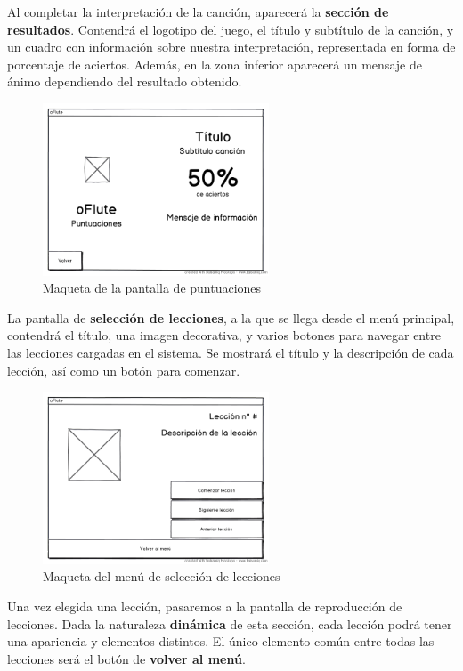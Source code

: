 \pagebreak

Al completar la interpretación de la canción, aparecerá la \textbf{sección de
  resultados}. Contendrá el logotipo del juego, el título y subtítulo de la
canción, y un cuadro con información sobre nuestra interpretación, representada
en forma de porcentaje de aciertos. Además, en la zona inferior aparecerá un
mensaje de ánimo dependiendo del resultado obtenido.

\begin{figure}[h!]
  \centering
  \includegraphics[width=0.6\textwidth]{desarrollo/mockup_puntuaciones}
  \caption{Maqueta de la pantalla de puntuaciones}
\end{figure}

La pantalla de \textbf{selección de lecciones}, a la que se llega desde el menú
principal, contendrá el título, una imagen decorativa, y varios botones para
navegar entre las lecciones cargadas en el sistema. Se mostrará el título y la
descripción de cada lección, así como un botón para comenzar.

\begin{figure}[h!]
  \centering
  \includegraphics[width=0.6\textwidth]{desarrollo/mockup_seleccionar_leccion}
  \caption{Maqueta del menú de selección de lecciones}
\end{figure}

Una vez elegida una lección, pasaremos a la pantalla de reproducción de
lecciones. Dada la naturaleza \textbf{dinámica} de esta sección, cada lección
podrá tener una apariencia y elementos distintos. El único elemento común entre
todas las lecciones será el botón de \textbf{volver al menú}.

